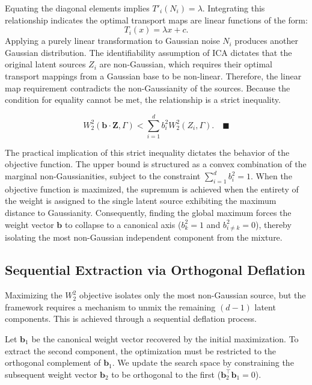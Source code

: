 \documentclass[12pt,a4paper,twoside,openany]{book}
\begin{document}
Equating the diagonal elements implies $T'_i(N_i) = \lambda$. Integrating this relationship indicates 
the optimal transport maps are linear functions of the form:
\begin{equation}
    T_i(x) = \lambda x + c.
\end{equation}
Applying a purely linear transformation to Gaussian noise $N_i$ produces another Gaussian distribution. 
The identifiability assumption of ICA dictates that the original latent sources $Z_i$ are non-Gaussian, 
which requires their optimal transport mappings from a Gaussian base to be non-linear. Therefore, the linear map requirement 
contradicts the non-Gaussianity of the sources. Because the condition for equality cannot be met, the relationship is a strict inequality. 

\begin{equation}
    W_2^2(\mathbf{b} \cdot \mathbf{Z}, \Gamma) < \sum_{i=1}^d b_i^2 W_2^2(Z_i, \Gamma). \quad \blacksquare
\end{equation} 

The practical implication of this strict inequality dictates the behavior of the objective function. 
The upper bound is structured as a convex combination of the marginal non-Gaussianities, 
subject to the constraint $\sum_{i=1}^d b_i^2 = 1$. When the objective function is maximized, 
the supremum is achieved when the entirety of the weight is assigned to the single 
latent source exhibiting the maximum distance to Gaussianity. Consequently, finding the global maximum forces 
the weight vector $\mathbf{b}$ to collapse to a canonical axis ($b_k^2 = 1$ and $b_{i \neq k}^2 = 0$), 
thereby isolating the most non-Gaussian independent component from the mixture.

\subsection{Sequential Extraction via Orthogonal Deflation}
Maximizing the $W_2^2$ objective isolates only the most non-Gaussian source, 
but the framework requires a mechanism to unmix the remaining $(d-1)$ latent components. This is achieved through a sequential deflation process.

Let $\mathbf{b}_1$ be the canonical weight vector recovered by the initial maximization. 
To extract the second component, the optimization must be restricted to the orthogonal complement of $\mathbf{b}_1$. 
We update the search space by constraining the subsequent weight vector $\mathbf{b}_2$ to be orthogonal to the first ($\mathbf{b}_2^\top \mathbf{b}_1 = 0$). 
\end{document}
